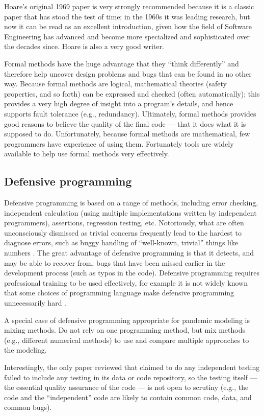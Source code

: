 \documentclass[10pt,a4paper]{article}
\begin{document}
Hoare's original 1969 paper \cite{hoare} is very strongly recommended because it is a classic paper that has stood the test of time; in the 1960s it was leading research, but now it can be read as an excellent introduction, given how the field of Software Engineering has advanced and become more specialized and sophisticated over the decades since. Hoare is also a very good writer.

Formal methods have the huge advantage that they ``think differently'' and therefore help uncover design problems and bugs that can be found in no other way. Because formal methods are logical, mathematical theories (safety properties, and so forth) can be expressed and checked (often automatically); this provides a very high degree of insight into a program's details, and hence supports fault tolerance (e.g., redundancy). Ultimately, formal methods provides good reasons to believe the quality of the final code --- that it does what it is supposed to do. Unfortunately, because formal methods are mathematical, few programmers have experience of using them. Fortunately tools are widely available to help use formal methods very effectively.

\subsection{Defensive programming} 
Defensive programming is based on a range of methods, including error checking, independent calculation (using multiple implementations written by independent programmers), assertions, regression testing, etc. Notoriously, what are often unconsciously dismissed as trivial concerns frequently lead to the hardest to diagnose errors, such as buggy handling of ``well-known, trivial'' things like numbers \cite{numerals}. The great advantage of defensive programming is that it detects, and may be able to recover from, bugs that have been missed earlier in the development process (such as typos in the code). Defensive programming requires professional training to be used effectively, for example it is not widely known that some choices of programming language make defensive programming unnecessarily hard \cite{heedless}.

A special case of defensive programming appropriate for pandemic modeling is mixing methods. Do not rely on one programming method, but mix methods (e.g., different numerical methods) to use and compare multiple approaches to the modeling.

Interestingly, the only paper reviewed that claimed to do any independent testing \cite{onlyPaperWithChecks} failed to include any testing in its data or code repository, so the testing itself --- the essential quality assurance of the code --- is not open to scrutiny (e.g., the code and the ``independent'' code are likely to contain common code, data, and common bugs).
\end{document}
